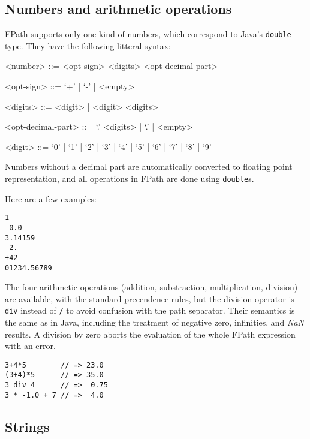 \documentclass[a4paper,12pt]{report}
\begin{document}
\subsection{Numbers and arithmetic operations}
\label{sec:numbers}

FPath supports only one kind of numbers, which correspond to Java's \texttt{double} type.
They have the following litteral syntax:
\begin{grammar}
<number> ::= <opt-sign> <digits> <opt-decimal-part>

<opt-sign> ::= `+' | `-' | <empty>

<digits> ::= <digit> | <digit> <digits>

<opt-decimal-part> ::= `.' <digits> | `.' | <empty>

<digit> ::= `0' | `1' | `2' | `3' | `4' | `5' | `6' | `7' | `8' | `9'
\end{grammar}

Numbers without a decimal part are automatically converted to floating point
representation, and all operations in FPath are done using \texttt{double}s.

Here are a few examples:
\begin{verbatim}
1
-0.0
3.14159
-2.
+42
01234.56789
\end{verbatim}

The four arithmetic operations (addition, substraction, multiplication, division) are
available, with the standard precendence rules, but the division operator is \texttt{div}
instead of \texttt{/} to avoid confusion with the path separator. Their semantics is the
same as in Java, including the treatment of negative zero, infinities, and \textsl{NaN}
results. A division by zero aborts the evaluation of the whole FPath expression with an
error.

\begin{verbatim}
3+4*5        // => 23.0
(3+4)*5      // => 35.0
3 div 4      // =>  0.75
3 * -1.0 + 7 // =>  4.0
\end{verbatim}

\subsection{Strings}
\label{sec:strings}
\end{document}

